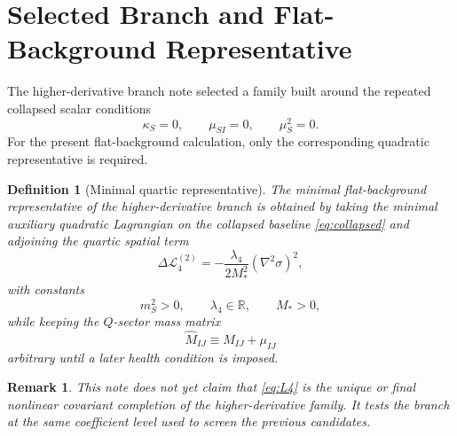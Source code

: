 \documentclass[11pt]{article}
\newtheorem{definition}{Definition}
\newtheorem{remark}{Remark}
\begin{document}
\section{Selected Branch and Flat-Background Representative}

The higher-derivative branch note selected a family built around the repeated collapsed scalar conditions
\begin{equation}
\kappa_S=0,
\qquad
\mu_{SI}=0,
\qquad
\mu_S^2=0.
\label{eq:collapsed}
\end{equation}
For the present flat-background calculation, only the corresponding quadratic representative is required.

\begin{definition}[Minimal quartic representative]
The minimal flat-background representative of the higher-derivative branch is obtained by taking the minimal auxiliary quadratic Lagrangian on the collapsed baseline \eqref{eq:collapsed} and adjoining the quartic spatial term
\begin{equation}
\Delta\mathcal L_4^{(2)}
=
-\frac{\lambda_4}{2M_*^2}(\nabla^2\sigma)^2,
\label{eq:L4}
\end{equation}
with constants
\begin{equation}
m_S^2>0,
\qquad
\lambda_4\in\mathbb R,
\qquad
M_*>0,
\label{eq:branchparams}
\end{equation}
while keeping the \(Q\)-sector mass matrix
\begin{equation}
\widehat M_{IJ}\equiv M_{IJ}+\mu_{IJ}
\label{eq:Mhat}
\end{equation}
arbitrary until a later health condition is imposed.
\end{definition}

\begin{remark}
This note does not yet claim that \eqref{eq:L4} is the unique or final nonlinear covariant completion of the higher-derivative family. It tests the branch at the same coefficient level used to screen the previous candidates.
\end{remark}
\end{document}

